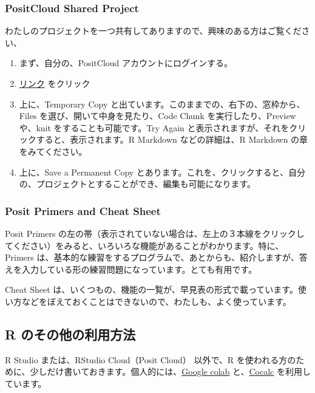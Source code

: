 \documentclass[
]{bxjsbook}
\providecommand{\tightlist}{%
  \setlength{\itemsep}{0pt}\setlength{\parskip}{0pt}}
\theoremstyle{definition}
\theoremstyle{definition}
\theoremstyle{definition}
\theoremstyle{definition}
\theoremstyle{remark}
\begin{document}
\hypertarget{positcloud-shared-project}{%
\subsubsection{PositCloud Shared Project}\label{positcloud-shared-project}}

わたしのプロジェクトを一つ共有してありますので、興味のある方はご覧ください、

\begin{enumerate}
\def\labelenumi{\arabic{enumi}.}
\tightlist
\item
  まず、自分の、PositCloud アカウントにログインする。
\item
  \href{https://posit.cloud/content/5539763}{リンク} をクリック
\item
  上に、Temporary Copy と出ています。このままでの、右下の、窓枠から、Files を選び、開いて中身を見たり、Code Chunk を実行したり、Preview や、knit をすることも可能です。Try Again と表示されますが、それをクリックすると、表示されます。R Markdown などの詳細は、R Markdown の章をみてください。
\item
  上に、Save a Permanent Copy とあります。これを、クリックすると、自分の、プロジェクトとすることができ、編集も可能になります。
\end{enumerate}

\hypertarget{posit-primers-and-cheat-sheet}{%
\subsubsection{Posit Primers and Cheat Sheet}\label{posit-primers-and-cheat-sheet}}

Posit Primers の左の帯（表示されていない場合は、左上の３本線をクリックしてください）をみると、いろいろな機能があることがわかります。特に、Primers は、基本的な練習をするプログラムで、あとからも、紹介しますが、答えを入力している形の練習問題になっています。とても有用です。

Cheat Sheet は、いくつもの、機能の一覧が、早見表の形式で載っています。使い方などをぼえておくことはできないので、わたしも、よく使っています。

\hypertarget{r-ux306eux305dux306eux4ed6ux306eux5229ux7528ux65b9ux6cd5}{%
\subsection{R のその他の利用方法}\label{r-ux306eux305dux306eux4ed6ux306eux5229ux7528ux65b9ux6cd5}}

R Studio または、RStudio Cloud（Posit Cloud） 以外で、R を使われる方のために、少しだけ書いておきます。個人的には、\href{https://colab.research.google.com}{Google colab} と、\href{https://cocalc.com}{Cocalc} を利用しています。
\end{document}
